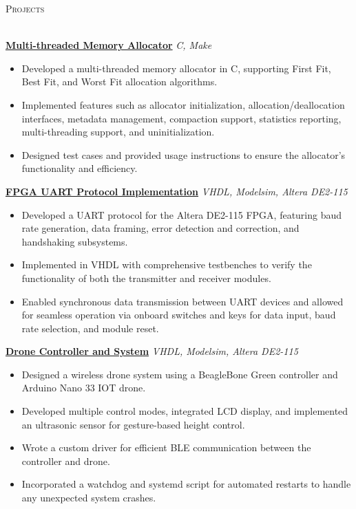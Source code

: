 \documentclass[a4paper]{article}
\newcommand{\lineunder} {
    \vspace*{-8pt} \\
    \hspace*{-18pt} \hrulefill \\
}
\newcommand{\header} [1] {
    {\hspace*{-18pt}\vspace*{6pt} \textsc{#1}}
    \vspace*{-6pt} \lineunder
}
\begin{document}
\header{Projects}
\vspace{1mm}

\href{https://github.com/SatireSage/Multi-threaded-Memory-Allocator}{\textbf{Multi-threaded Memory Allocator}} {\sl C, Make}
\vspace{-2mm}
\begin{itemize} \itemsep -3pt
    \item Developed a multi-threaded memory allocator in C, supporting First Fit, Best Fit, and Worst Fit allocation algorithms.
    \item Implemented features such as allocator initialization, allocation/deallocation interfaces, metadata management, compaction support, statistics reporting, multi-threading support, and uninitialization.
    \item Designed test cases and provided usage instructions to ensure the allocator's functionality and efficiency.
\end{itemize}

\href{https://github.com/SatireSage/FPGA-UART-Protocol}{\textbf{FPGA UART Protocol Implementation}} {\sl VHDL, Modelsim, Altera DE2-115}
\vspace{-2mm}
\begin{itemize} \itemsep -3pt
    \item Developed a UART protocol for the Altera DE2-115 FPGA, featuring baud rate generation, data framing, error detection and correction, and handshaking subsystems.
    \item Implemented in VHDL with comprehensive testbenches to verify the functionality of both the transmitter and receiver modules.
    \item Enabled synchronous data transmission between UART devices and allowed for seamless operation via onboard switches and keys for data input, baud rate selection, and module reset.
\end{itemize}

\href{https://github.com/SatireSage/Dronee}{\textbf{Drone Controller and System}} {\sl VHDL, Modelsim, Altera DE2-115}
\vspace{-2mm}
\begin{itemize} \itemsep -3pt
    \item Designed a wireless drone system using a BeagleBone Green controller and Arduino Nano 33 IOT drone.
    \item Developed multiple control modes, integrated LCD display, and implemented an ultrasonic sensor for gesture-based height control.
    \item Wrote a custom driver for efficient BLE communication between the controller and drone.
    \item Incorporated a watchdog and systemd script for automated restarts to handle any unexpected system crashes.
\end{itemize}
\end{document}
